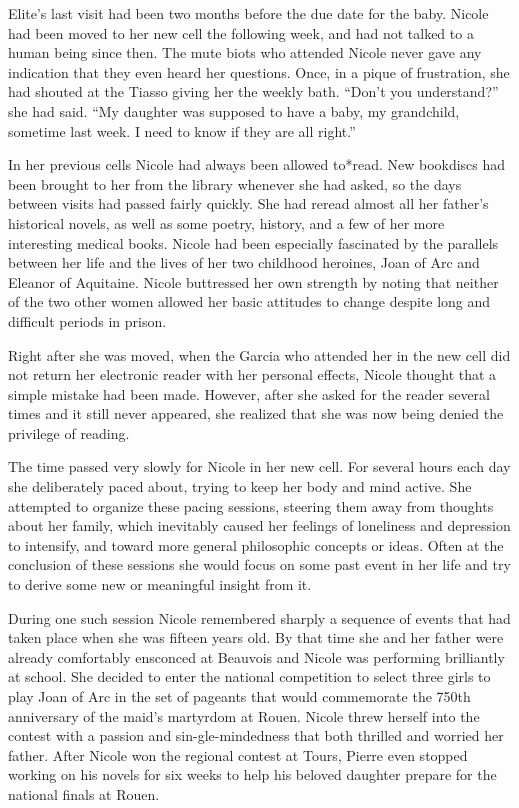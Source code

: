 \documentclass[]{article}
\begin{document}
{{Elite’s last visit had been two months before the due date for the baby.  Nicole had been moved to her new cell the following week, and had not talked to a human being since then.  The mute biots who attended Nicole never gave any indication that they even heard her questions.  Once, in a pique of frustration, she had shouted at the Tiasso giving her the weekly bath.  “Don’t you understand?” she had said.  “My daughter was supposed to have a baby, my grandchild, sometime last week.  I need to know if they are all right.”

In her previous cells Nicole had always been allowed to*read.  New bookdiscs had been brought to her from the library whenever she had asked, so the days between visits had passed fairly quickly.  She had reread almost all her father’s historical novels, as well as some poetry, history, and a few of her more interesting medical books.  Nicole had been especially fascinated by the parallels between her life and the lives of her two childhood heroines, Joan of Arc and Eleanor of Aquitaine.  Nicole buttressed her own strength by noting that neither of the two other women allowed her basic attitudes to change despite long and difficult periods in prison.

Right after she was moved, when the Garcia who attended her in the new cell did not return her electronic reader with her personal effects, Nicole thought that a simple mistake had been made.  However, after she asked for the reader several times and it still never appeared, she realized that she was now being denied the privilege of reading.

The time passed very slowly for Nicole in her new cell.  For several hours each day she deliberately paced about, trying to keep her body and mind active.  She attempted to organize these pacing sessions, steering them away from thoughts about her family, which inevitably caused her feelings of loneliness and depression to intensify, and toward more general philosophic concepts or ideas.  Often at the conclusion of these sessions she would focus on some past event in her life and try to derive some new or meaningful insight from it.

During one such session Nicole remembered sharply a sequence of events that had taken place when she was fifteen years old.  By that time she and her father were already comfortably ensconced at Beauvois and Nicole was performing brilliantly at school.  She decided to enter the national competition to select three girls to play Joan of Arc in the set of pageants that would commemorate the 750th anniversary of the maid’s martyrdom at Rouen.  Nicole threw herself into the contest with a passion and sin-gle-mindedness that both thrilled and worried her father.  After Nicole won the regional contest at Tours, Pierre even stopped working on his novels for six weeks to help his beloved daughter prepare for the national finals at Rouen.

}}
\end{document}
